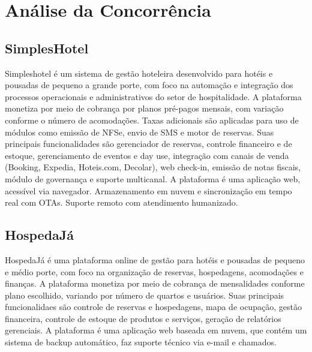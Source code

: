 \documentclass[
	12pt,				%
	openany,			%
	twoside,			%
	a4paper,			%
	english,			%
	french,				%
	spanish,			%
	brazil				%
	]{abntex2}
\begin{document}
\section{Análise da Concorrência}
\subsection{SimplesHotel}
Simpleshotel é um sistema de gestão hoteleira desenvolvido para hotéis e pousadas de pequeno a grande porte, com foco na automação e integração dos processos operacionais e administrativos do setor de hospitalidade.
A plataforma monetiza por meio de cobrança por planos pré-pagos mensais, com variação conforme o número de acomodações. Taxas adicionais são aplicadas para uso de módulos como emissão de NFSe, envio de SMS e motor de reservas.
Suas principais funcionalidades são gerenciador de reservas, controle financeiro e de estoque, gerenciamento de eventos e day use, integração com canais de venda (Booking, Expedia, Hoteis.com, Decolar), web check-in, emissão de notas fiscais, módulo de governança e suporte multicanal.
A plataforma é uma aplicação web, acessível via navegador. Armazenamento em nuvem e sincronização em tempo real com OTAs. Suporte remoto com atendimento humanizado.
\subsection{HospedaJá}
HospedaJá é uma plataforma online de gestão para hotéis e pousadas de pequeno e médio porte, com foco na organização de reservas, hospedagens, acomodações e finanças.
A plataforma monetiza por meio de cobrança de mensalidades conforme plano escolhido, variando por número de quartos e usuários.
Suas principais funcionalidaes são controle de reservas e hospedagens, mapa de ocupação, gestão financeira, controle de estoque de produtos e serviços, geração de relatórios gerenciais.
A plataforma é uma aplicação web baseada em nuvem, que contém um sistema de backup automático, faz suporte técnico via e-mail e chamados.
\end{document}
